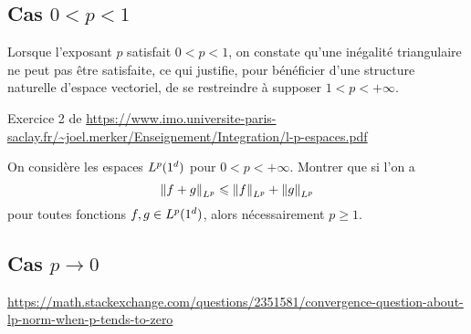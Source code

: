 \subsection{Cas $0 < p < 1$}

Lorsque l’exposant $p$ satisfait $0 < p < 1$, on constate qu’une inégalité triangulaire ne peut pas être satisfaite, ce qui justifie, pour bénéficier d’une structure naturelle
d’espace vectoriel, de se restreindre à supposer $1 < p < +\infty$. 

Exercice 2 de \url{https://www.imo.universite-paris-saclay.fr/~joel.merker/Enseignement/Integration/l-p-espaces.pdf}
\begin{exercice}
    On considère les espaces $L^p(1^d)$ pour  $0 < p < +\infty$. Montrer que si l'on a 
    \[
    \norm{f + g}_{L^p} \leqslant  \norm{f}_{L^p} + \norm{g}_{L^p}
    \]
    pour toutes fonctions $f, g \in L^p(1^d )$, alors nécessairement $p \geqslant 1$.
\end{exercice}

\subsection{Cas $p \to 0$}

\url{https://math.stackexchange.com/questions/2351581/convergence-question-about-lp-norm-when-p-tends-to-zero}
